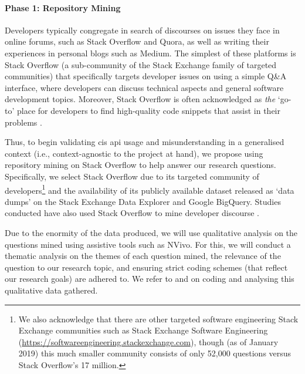 \paragraph{Phase 1: Repository Mining}
Developers typically congregate in search of discourses on issues they face in online forums, such as Stack Overflow and Quora, as well as writing their experiences in personal blogs such as Medium. The simplest of these platforms is Stack Overflow (a sub-community of the Stack Exchange family of targeted communities) that specifically targets developer issues on using a simple Q\&A interface, where developers can discuss technical aspects and general software development topics. Moreover, Stack Overflow is often acknowledged as \textit{the} `go-to' place for developers to find high-quality code snippets that assist in their problems \citep{Subramanian:2014bg}.

Thus, to begin validating \gls{cis} \gls{api} usage and misunderstanding in a generalised context (i.e., context-agnostic to the project at hand), we propose using repository mining on Stack Overflow to help answer our research questions. Specifically, we select Stack Overflow due to its targeted community of developers\footnote{We also acknowledge that there are other targeted software engineering Stack Exchange communities such as Stack Exchange Software Engineering (\url{https://softwareengineering.stackexchange.com}), though (as of January 2019) this much smaller community consists of only 52,000 questions versus Stack Overflow's 17 million.} and the availability of its publicly available dataset released as `data dumps' on the Stack Exchange Data Explorer and Google BigQuery. Studies conducted have also used Stack Overflow to mine developer discourse \citep{Choi:2015wo,Sinha:2013tt,Novielli:2015vd,Rosen:2016uk,Pal:2012te,Bajaj:2014wg,LinaresVasquez:2014vj,Wang:2013ue,Barua:2014vo,Reboucas:2016tw,Allamanis:2013vb,Tahir:2018ks}.

Due to the enormity of the data produced, we will use qualitative analysis on the questions mined using assistive tools such as NVivo. For this, we will conduct a thematic analysis on the themes of each question mined, the relevance of the question to our research topic, and ensuring strict coding schemes (that reflect our research goals) are adhered to. We refer to \citet{Singer:2007tu} and \citet{Miles:1994ty} on coding and analysing this qualitative data gathered.

